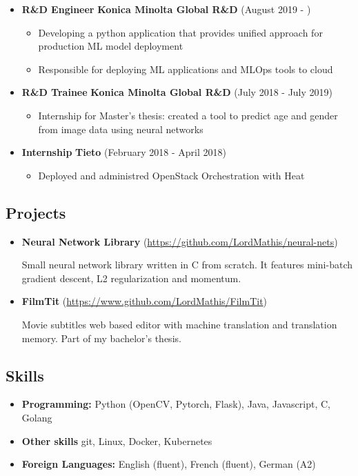 \documentclass[a4,12pt]{article}
\providecommand{\tightlist}{%
  \setlength{\itemsep}{0pt}\setlength{\parskip}{0pt}}
\begin{document}
\begin{itemize}
\item
  \textbf{R\&D Engineer} \hfill \textbf{Konica Minolta Global R\&D} \hfill (August 2019 - )
  \begin{itemize}
      \item Developing a python application that provides unified approach for production ML model deployment
      \item Responsible for deploying ML applications and MLOps tools to cloud
  \end{itemize}
\item
  \textbf{R\&D Trainee} \hfill \textbf{Konica Minolta Global R\&D} \hfill (July 2018 - July 2019)
  \begin{itemize}
      \item Internship for Master's thesis: created a tool to predict age and gender from image data using neural networks
  \end{itemize}
\item
  \textbf{Internship} \hfill \textbf{Tieto} \hfill (February 2018 - April 2018)
  \begin{itemize}
      \item Deployed and administred OpenStack Orchestration with Heat
  \end{itemize}
\end{itemize}

\subsection*{Projects}\label{projects}

\begin{itemize}

\item
    \textbf{Neural Network Library} (\href{https://github.com/LordMathis/neural-nets}{https://github.com/LordMathis/neural-nets})

    Small neural network library written in C from scratch. It features mini-batch gradient descent, L2 regularization and momentum.

\item
  \textbf{FilmTit} (\href{https://www.github.com/LordMathis/FilmTit}{https://www.github.com/LordMathis/FilmTit})

  Movie subtitles web based editor with machine translation and
  translation memory. Part of my bachelor's thesis.
  

\end{itemize}

\subsection*{Skills}\label{skills}

\begin{itemize}
\tightlist
\item
  \textbf{Programming:} Python (OpenCV, Pytorch, Flask), Java, Javascript, C, Golang
\item
  \textbf{Other skills} git, Linux, Docker, Kubernetes
\item
  \textbf{Foreign Languages:} English (fluent), French (fluent), German (A2)
\end{itemize}
\end{document}
